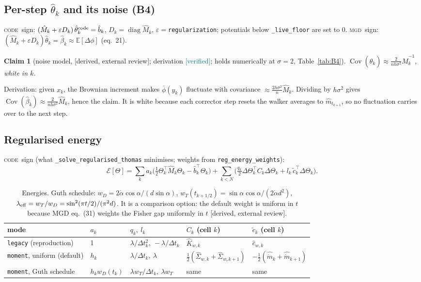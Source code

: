 \documentclass[11pt,a4paper]{article}
\newcommand{\code}[1]{\texttt{#1}}
\newcommand{\ver}{\textcolor{teal}{\textsf{[verified]}}}
\newcommand{\ext}{\textcolor{purple!80!black}{\textsf{[derived, external review]}}}
\newcommand{\E}{\mathbb{E}}
\newcommand{\Cov}{\operatorname{Cov}}
\newcommand{\dt}{\Delta t}
\newcommand{\MGD}{\textsc{mgd}}
\newcommand{\cs}{\textsc{code}}
\newtheorem*{claim}{Claim}
\begin{document}
\subsection{Per-step $\hat\theta_k$ and its noise (B4)}
\cs\ sign: $(\hat M_k+\varepsilon D_k)\,\hat\theta^{\rm code}_k=\hat b_k$, $D_k=\operatorname{diag}\hat M_k$, $\varepsilon=$\code{regularization}; potentials below
\code{\_live\_floor} are set to 0. \MGD\ sign: $(\hat M_k+\varepsilon D_k)\hat\theta_k=\hat\beta_k\approx\E[\Delta\phi]$ (eq.~21).
\begin{claim}[noise model, \ext; derivation \ver; holds numerically at $\sigma=2$, Table~\ref{tab:B4}]
$\Cov(\hat\theta_k)\approx\frac{2}{nh\sigma^2}\hat M_k^{-1}$, white in $k$.
\end{claim}
Derivation: given $x_k$, the Brownian increment makes $\bar\phi(y_k)$ fluctuate with covariance $\approx\frac{2h\sigma^2}{n}\hat M_k$.
Dividing by $h\sigma^2$ gives $\Cov(\hat\beta_k)\approx\frac{2}{nh\sigma^2}\hat M_k$, hence the claim. It is white because each corrector step resets the walker
averages to $\hat m_{t_{k+1}}$, so no fluctuation carries over to the next step.

\subsection{Regularised energy}
\cs\ sign (what \code{\_solve\_regularised\_thomas} minimises; weights from \code{reg\_energy\_weights}):
\begin{equation}\label{eq:energy}
\mathcal E[\Theta]=\sum_ka_k\Big(\tfrac12\Theta_k^\top\hat M_k\Theta_k-\hat b_k^\top\Theta_k\Big)
+\sum_{k<N}\Big(\tfrac{q_k}2\Delta\Theta_k^\top C_k\Delta\Theta_k+l_k\,\tilde c_k^\top\Delta\Theta_k\Big).
\end{equation}
\begin{table}[h]\centering\small
\begin{tabular}{@{}lllll@{}}\toprule
mode & $a_k$ & $q_k,\ l_k$ & $C_k$ (cell $k$) & $\tilde c_k$ (cell $k$) \\\midrule
\code{legacy} (reproduction) & 1 & $\lambda/\dt_k^2,\ -\lambda/\dt_k$ & $\hat K_{w,k}$ & $\hat c_{w,k}$\\
\code{moment}, uniform (default) & $h_k$ & $\lambda/\dt_k,\ \lambda$ & $\frac12(\hat\Sigma_{w,k}+\hat\Sigma_{w,k+1})$ & $-\frac12(\hat{\dot m}_k+\hat{\dot m}_{k+1})$\\
\code{moment}, Guth schedule & $h_kw_D(t_k)$ & $\lambda w_T/\dt_k,\ \lambda w_T$ & same & same\\\bottomrule
\end{tabular}
\caption{Energies. Guth schedule: $w_D=2\dot\alpha\cos\alpha/(d\sin\alpha)$, $w_T(t_{k+1/2})=\sin\alpha\cos\alpha/(2\dot\alpha d^2)$,
$\lambda_{\rm eff}=w_T/w_D=\sin^2(\pi t/2)/(\pi^2d)$. It is a comparison option: the default weight is uniform in $t$ because MGD eq.~(31)
weights the Fisher gap uniformly in $t$ \ext.}\label{tab:modes}
\end{table}
\end{document}
